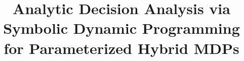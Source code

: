 \title{Analytic Decision Analysis via Symbolic Dynamic Programming for Parameterized Hybrid MDPs}


\maketitle